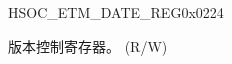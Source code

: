 \begin{register}{H}{SOC\_ETM\_DATE\_REG}{0x0224}\label{regdesc:SOCETMDATEREG}
%
%
\regnewline%
\begin{regdesc}\begin{reglist}
\label{fielddesc:SOCETMDATE}\item [SOC\_ETM\_DATE] 版本控制寄存器。 (R/W)
\end{reglist}\end{regdesc}
\end{register}
